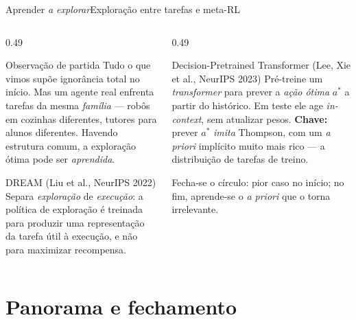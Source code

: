 \documentclass[aspectratio=169, 11pt]{beamer}
\begin{document}
\begin{frame}{Aprender \emph{a explorar}}{Exploração entre tarefas e meta-RL}
  \begin{columns}[T]
    \begin{column}{0.49\textwidth}
      \begin{defbox}{Observação de partida}
        Tudo o que vimos supõe \alert{ignorância total} no início. Mas um agente real
        enfrenta tarefas da mesma \emph{família} --- robôs em cozinhas diferentes,
        tutores para alunos diferentes. Havendo estrutura comum, a exploração ótima pode
        ser \emph{aprendida}.
      \end{defbox}
      \begin{teobox}{DREAM (Liu et al., NeurIPS 2022)}
        Separa \emph{exploração} de \emph{execução}: a política de exploração é treinada
        para produzir uma representação da tarefa útil à execução, e não para maximizar
        recompensa.
      \end{teobox}
    \end{column}
    \begin{column}{0.49\textwidth}
      \begin{teobox}{Decision-Pretrained Transformer (Lee, Xie et al., NeurIPS 2023)}
        Pré-treine um \textit{transformer} para prever a \emph{ação ótima} $a^{*}$ a
        partir do histórico. Em teste ele age \textit{in-context}, sem atualizar pesos.
        \textbf{Chave:} prever $a^{*}$ \emph{imita} Thompson, com um \textit{a priori}
        implícito muito mais rico --- a distribuição de tarefas de treino.
      \end{teobox}
      \begin{ideiabox}
        Fecha-se o círculo: pior caso no início; no fim, aprende-se o \textit{a priori}
        que o torna irrelevante.
      \end{ideiabox}
    \end{column}
  \end{columns}
\end{frame}

\section{Panorama e fechamento}
\end{document}
